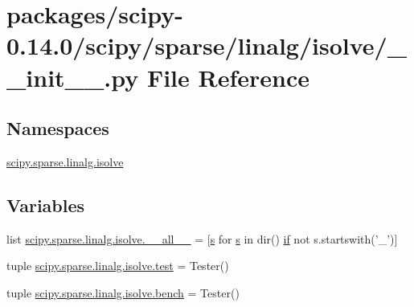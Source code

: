 \hypertarget{packages_2scipy-0_814_80_2scipy_2sparse_2linalg_2isolve_2____init_____8py}{}\section{packages/scipy-\/0.14.0/scipy/sparse/linalg/isolve/\+\_\+\+\_\+init\+\_\+\+\_\+.py File Reference}
\label{packages_2scipy-0_814_80_2scipy_2sparse_2linalg_2isolve_2____init_____8py}
\subsection*{Namespaces}
\begin{DoxyCompactItemize}
\item 
 \hyperlink{namespacescipy_1_1sparse_1_1linalg_1_1isolve}{scipy.\+sparse.\+linalg.\+isolve}
\end{DoxyCompactItemize}
\subsection*{Variables}
\begin{DoxyCompactItemize}
\item 
list \hyperlink{namespacescipy_1_1sparse_1_1linalg_1_1isolve_a1cd138cd71c60fbb3413daa461d33556}{scipy.\+sparse.\+linalg.\+isolve.\+\_\+\+\_\+all\+\_\+\+\_\+} = \mbox{[}\hyperlink{indexexpr_8h_ae024b0db549122b44c349ae28ec990dc}{s} for \hyperlink{indexexpr_8h_ae024b0db549122b44c349ae28ec990dc}{s} in dir() \hyperlink{minmax_8h_a30a0ee9fee303f01d9c5e6f669e0dfe9}{if} not s.\+startswith('\+\_\+')\mbox{]}
\item 
tuple \hyperlink{namespacescipy_1_1sparse_1_1linalg_1_1isolve_a2a4b2169cb9c00deb13f9ac56610c514}{scipy.\+sparse.\+linalg.\+isolve.\+test} = Tester()
\item 
tuple \hyperlink{namespacescipy_1_1sparse_1_1linalg_1_1isolve_add33126c2d7e05af5c9a948cb79a320e}{scipy.\+sparse.\+linalg.\+isolve.\+bench} = Tester()
\end{DoxyCompactItemize}
